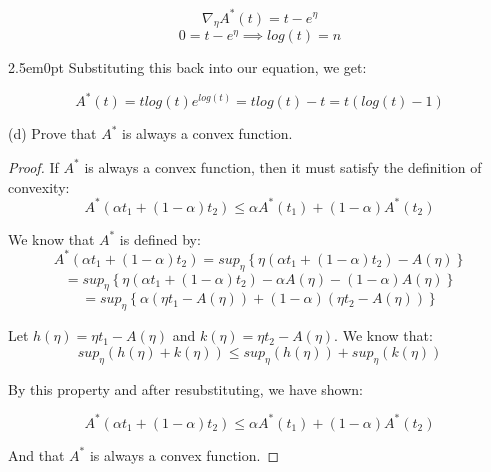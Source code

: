 \documentclass[11pt]{article}
\newenvironment{problem}[2][Problem]{\begin{trivlist}
\item[\hskip \labelsep {\bfseries #1}\hskip \labelsep {\bfseries #2.}]}{\end{trivlist}}
\begin{document}
\begin{problem}{2.2}
\[\nabla_{\eta} A^{*}(t) = t - e^{\eta} \]
\[0 = t - e^{\eta} \implies log(t) = n \]

\begin{adjustwidth}{2.5em}{0pt}
Substituting this back into our equation, we get:
\end{adjustwidth}
\[A^{*}(t) = tlog(t) e^{log(t)} = tlog(t) - t = t(log(t) - 1)\]

(d) Prove that $A^{*}$ is always a convex function.
\begin{proof}
If $A^{*}$ is always a convex function, then it must satisfy the definition of convexity: 
\[A^{*}(\alpha t_{1} + (1-\alpha)t_{2}) \leq \alpha A^{*}(t_{1}) + (1-\alpha)A^{*}(t_{2})\]

We know that $A^{*}$ is defined by:
\[A^{*}(\alpha t_{1} + (1-\alpha)t_{2}) = sup_{\eta}\left\{{\eta(\alpha t_{1} + (1-\alpha)t_{2}) - A(\eta)}\right\}\]
\[= sup_{\eta}\left\{{\eta(\alpha t_{1} + (1-\alpha)t_{2}) - \alpha A(\eta) - (1-\alpha)A(\eta)}\right\}\]
\[= sup_{\eta}\left\{{\alpha(\eta t_{1} - A(\eta)) + (1-\alpha)(\eta t_{2}-A(\eta))}\right\}\]

Let $h(\eta) = \eta t_{1} - A(\eta)$ and $k(\eta) = \eta t_{2}-A(\eta)$. We know that: 
\[sup_{\eta}(h(\eta) + k(\eta)) \leq sup_{\eta}(h(\eta)) + sup_{\eta}(k(\eta))\]

By this property and after resubstituting, we have shown: 

\[A^{*}(\alpha t_{1} + (1-\alpha)t_{2}) \leq \alpha A^{*}(t_{1}) + (1-\alpha)A^{*}(t_{2})\]

And that $A^{*}$ is always a convex function. 

\end{proof}

\end{problem}
\end{document}
